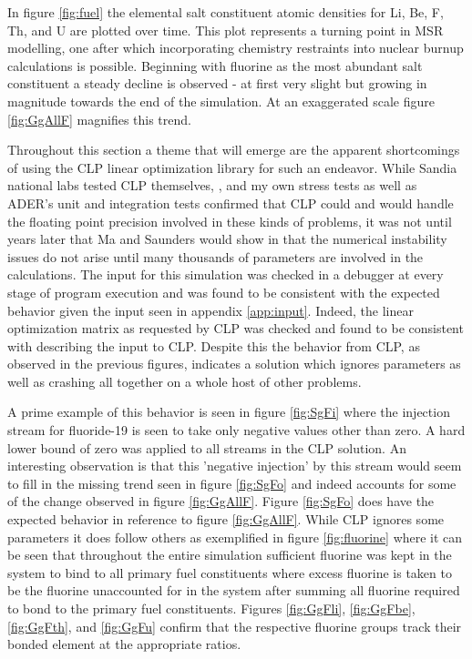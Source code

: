 In figure \ref{fig:fuel} the elemental salt constituent atomic
densities for Li, Be, F, Th, and U are plotted over time. This plot represents
a turning point in MSR modelling, one after which incorporating chemistry 
restraints into nuclear burnup calculations is possible. Beginning with fluorine
as the most abundant salt constituent a steady decline is observed - at first
very slight but growing in magnitude towards the end of the simulation. At an
exaggerated scale figure \ref{fig:GgAllF} magnifies this trend. 

Throughout this section a theme that will emerge are the apparent shortcomings
of using the CLP linear optimization library for such an endeavor. While Sandia
national labs tested CLP themselves, \cite{gearhart_comparison_2013}, and my
own stress tests as well as ADER's unit and integration tests confirmed that
CLP could and would handle the floating point precision involved in these kinds
of problems, it was not until years later that Ma and Saunders would show in
\cite{STANFORD} that the numerical instability issues do not arise until many
thousands of parameters are involved in the calculations. The input for this
simulation was checked in a debugger at every stage of program execution and was
found to be consistent with the expected behavior given the input seen in
appendix \ref{app:input}. Indeed, the linear optimization matrix as requested by
CLP was checked and found to be consistent with describing the input to CLP.
Despite this the behavior from CLP, as observed in the previous figures, 
indicates a solution which ignores parameters as well as crashing
all together on a whole host of other problems.

A prime example of this behavior is seen in figure \ref{fig:SgFi} where the
injection stream for fluoride-19 is seen to take only negative values other than
zero. A hard lower bound of zero was applied to all streams in the CLP solution.
An interesting observation is that this 'negative injection' by this stream
would seem to fill in the missing trend seen in figure \ref{fig:SgFo} and indeed
accounts for some of the change observed in figure \ref{fig:GgAllF}. Figure
\ref{fig:SgFo} does have the expected behavior in reference to figure
\ref{fig:GgAllF}. While CLP ignores some parameters it does follow others as
exemplified in figure \ref{fig:fluorine} where it can be seen that throughout
the entire simulation sufficient fluorine was kept in the system to bind to all
primary fuel constituents where excess fluorine is taken to be the fluorine 
unaccounted for in the system after summing all fluorine required to bond to the
primary fuel constituents. Figures \ref{fig:GgFli}, \ref{fig:GgFbe},
\ref{fig:GgFth}, and \ref{fig:GgFu} confirm that the respective fluorine
groups track their bonded element at the appropriate ratios.

